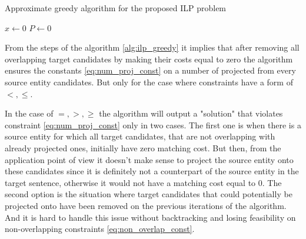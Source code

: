 \begin{algorithm}
  \caption{Approximate greedy algorithm for the proposed ILP problem} \label{alg:ilp_greedy}

  \( x \gets 0 \) \;
  \( P \gets 0 \) 
\end{algorithm}

From the steps of the algorithm \ref{alg:ilp_greedy} it implies that after removing all
overlapping target candidates by making their costs equal to zero the algorithm ensures the
constants \eqref{eq:num_proj_const} on a number of projected from every source entity candidates.
But only for the case where constraints have a form of \( <, \leq \).

In the case of \( =, >, \geq \) the algorithm will output a "solution" that violates constraint
\eqref{eq:num_proj_const} only in two cases. The first one is when there is a source entity for which
all target candidates, that are not overlapping with already projected ones, initially have zero matching cost. But then,
from the application point of view it doesn't make sense to project the source entity onto these candidates
since it is definitely not a counterpart of the source entity in the target sentence, otherwise it would not
have a matching cost equal to \( 0 \). The second option is the situation where target candidates
that could potentially be projected onto have been removed on the previous iterations of the algorithm.
And it is hard to handle this issue without backtracking and losing feasibility on
non-overlapping constraints \eqref{eq:non_overlap_const}.

